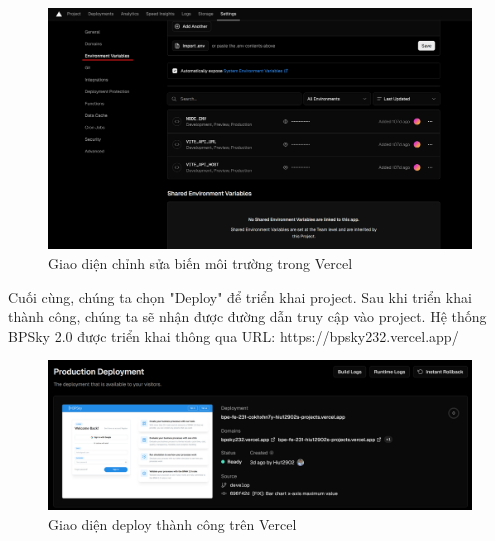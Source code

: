\begin{figure}[H]
    \centering
    \includegraphics[width=0.7\linewidth]{Content/Hiện thực hệ thống/images/editEnvironmentVariablesVercel.png}
    \vspace{0.5cm}
    \caption{Giao diện chỉnh sửa biến môi trường trong Vercel}
    \label{fig:chỉnh sửa biến môi trường trong Vercel}
\end{figure}

Cuối cùng, chúng ta chọn "Deploy" để triển khai project. Sau khi triển khai thành công, chúng ta sẽ nhận được đường dẫn truy cập vào project. Hệ thống BPSky 2.0 được triển khai thông qua URL: https://bpsky232.vercel.app/

\begin{figure}[H]
    \centering
    \includegraphics[width=0.7\linewidth]{Content/Hiện thực hệ thống/images/deployVercelSuccessful.png}
    \vspace{0.5cm}
    \caption{Giao diện deploy thành công trên Vercel}
    \label{fig:deploy thành công trên Vercel}
\end{figure}